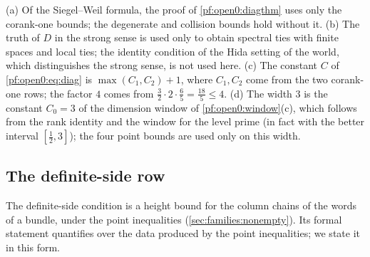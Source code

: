 \begin{remark}\label{pf:open0:rem:diag}
(a) Of the Siegel--Weil formula, the proof of \cref{pf:open0:diagthm} uses only the corank-one bounds; the degenerate and collision
bounds hold without it. (b) The truth of $D$ in the strong sense is used only to obtain spectral ties with finite spaces and local
ties; the identity condition of the Hida setting of the world, which distinguishes the strong sense, is not used here. (c) The
constant $C$ of \eqref{pf:open0:eq:diag} is $\max(C_1,C_2)+1$, where $C_1,C_2$ come from the two corank-one rows; the factor $4$ comes
from $\frac32\cdot2\cdot\frac65=\frac{18}5\le4$. (d) The width $3$ is the constant $C_0=3$ of the dimension window of
\cref{pf:open0:window}(c), which follows from the rank identity and the window for the level prime (in fact with the better
interval $[\frac12,3]$); the four point bounds are used only on this width.
\end{remark}

\subsection{The definite-side row}\label{sec:pf:open0:df}

The definite-side condition is a height bound for the column chains of the words of a bundle, under the point inequalities
(\cref{sec:families:nonempty}). Its formal statement quantifies over the data produced by the point inequalities; we state
it in this form.

